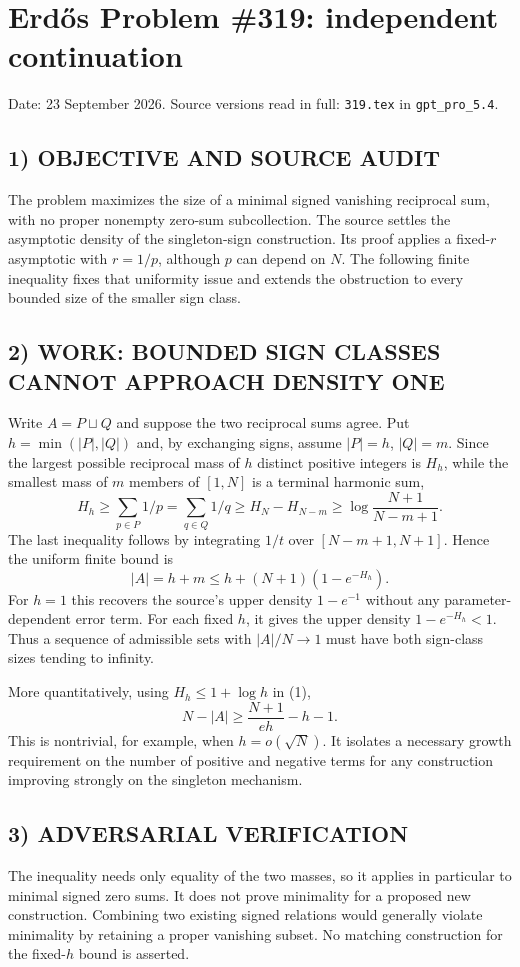 \section{Erd\H{o}s Problem \#319: independent continuation}
\noindent Date: 23 September 2026. Source versions read in full: \texttt{319.tex} in \texttt{gpt\_pro\_5.4}.

\subsection*{1) OBJECTIVE AND SOURCE AUDIT}
The problem maximizes the size of a minimal signed vanishing reciprocal
sum, with no proper nonempty zero-sum subcollection. The source settles
the asymptotic density of the singleton-sign construction. Its proof
applies a fixed-$r$ asymptotic with $r=1/p$, although $p$ can depend on $N$.
The following finite inequality fixes that uniformity issue and extends
the obstruction to every bounded size of the smaller sign class.

\subsection*{2) WORK: BOUNDED SIGN CLASSES CANNOT APPROACH DENSITY ONE}
Write $A=P\sqcup Q$ and suppose the two reciprocal sums agree. Put
$h=\min(|P|,|Q|)$ and, by exchanging signs, assume $|P|=h$, $|Q|=m$.
Since the largest possible reciprocal mass of $h$ distinct positive
integers is $H_h$, while the smallest mass of $m$ members of $[1,N]$
is a terminal harmonic sum,
\[
 H_h\ge\sum_{p\in P}1/p=\sum_{q\in Q}1/q
 \ge H_N-H_{N-m}
 \ge\log\frac{N+1}{N-m+1}.
\]
The last inequality follows by integrating $1/t$ over $[N-m+1,N+1]$.
Hence the uniform finite bound is
\[
 |A|=h+m\le h+(N+1)(1-e^{-H_h}). \tag{1}
\]
For $h=1$ this recovers the source's upper density $1-e^{-1}$ without
any parameter-dependent error term. For each fixed $h$, it gives the
upper density $1-e^{-H_h}<1$. Thus a sequence of admissible sets with
$|A|/N\to1$ must have both sign-class sizes tending to infinity.

More quantitatively, using $H_h\le1+\log h$ in (1),
\[
 N-|A|\ge\frac{N+1}{eh}-h-1.
\]
This is nontrivial, for example, when $h=o(\sqrt N)$. It isolates a
necessary growth requirement on the number of positive and negative terms
for any construction improving strongly on the singleton mechanism.

\subsection*{3) ADVERSARIAL VERIFICATION}
The inequality needs only equality of the two masses, so it applies in
particular to minimal signed zero sums. It does not prove minimality
for a proposed new construction. Combining two existing signed relations
would generally violate minimality by retaining a proper vanishing subset.
No matching construction for the fixed-$h$ bound is asserted.

